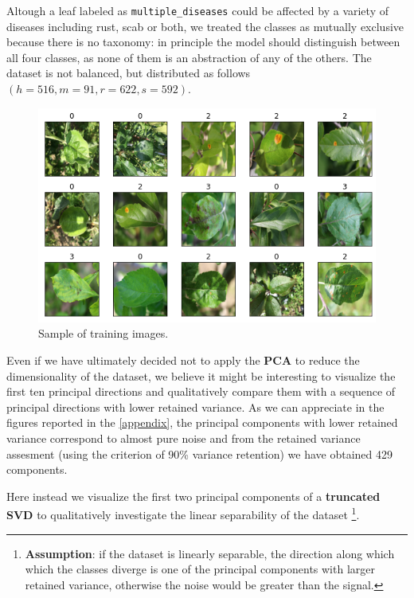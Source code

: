 \documentclass[aps,twocolumn,secnumarabic,nobalancelastpage,amsmath,amssymb,
nofootinbib]{revtex4}
\begin{document}
Altough a leaf labeled as \texttt{multiple\_diseases} could be affected
by a variety of diseases including rust, scab or both, we treated the
classes as mutually exclusive because there is no taxonomy: in principle
the model should distinguish between all four classes, as none of them
is an abstraction of any of the others. The dataset is not balanced, but
distributed as follows \((h = 516, m = 91, r = 622, s = 592)\).

\begin{figure}[h]
	\centering
	\includegraphics[width=0.9\linewidth]{Images/InputImages}
	\caption{Sample of training images.}
	\label{fig:inputimages}
\end{figure}


Even if we have ultimately decided not to apply the \textbf{PCA} to
reduce the dimensionality of the dataset, we believe it might be
interesting to visualize the first ten principal directions and
qualitatively compare them with a sequence of principal directions with
lower retained variance. As we can appreciate in the figures reported in
the \ref{appendix}, the principal components with
lower retained variance correspond to almost pure noise and from the
retained variance assesment (using the criterion of 90\% variance
retention) we have obtained 429 components.\newline

Here instead we visualize the first two principal components of a
\textbf{truncated SVD} to qualitatively investigate the linear
separability of the dataset \footnote{\textbf{Assumption}: if the
	dataset is linearly separable, the direction along which which the
	classes diverge is one of the principal components with larger
	retained variance, otherwise the noise would be greater than the
	signal.}.
\end{document}
